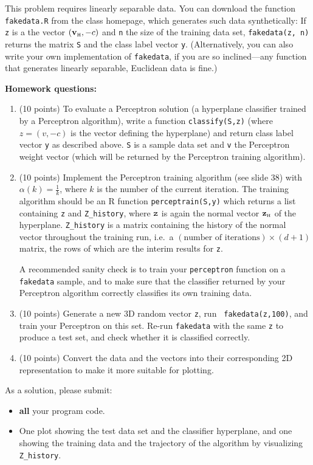 \documentclass[]{../util/ColumbiaAssm}
\begin{document}
\begin{questions}
This problem requires linearly separable data. You can download the function
{\tt fakedata.R} from the class homepage, which generates such data synthetically:
If {\tt z} is a the vector $(\mathbf{v}_{\mbox{\tiny H}},-c)$ and {\tt n} the size of the training data set,
{\tt fakedata(z, n)} returns the matrix {\tt S} and the class label vector {\tt y}.
(Alternatively, you can also write your own implementation of {\tt fakedata}, if you are so inclined---any function that generates linearly separable, Euclidean data is fine.)

\vspace{0.5cm}

\textbf{Homework questions:}
\begin{enumerate}
\item (10 points) To evaluate a Perceptron solution (a hyperplane
  classifier trained by a Perceptron algorithm), write a function
  {\tt classify(S,z)} (where $z=(v,-c)$ is the vector defining the hyperplane) 
  and return class label vector {\tt y} as described above. {\tt S} is a sample data set and {\tt v}
  the Perceptron weight vector (which will be returned by the
  Perceptron training algorithm). 
\item (10 points) Implement the Perceptron training algorithm (see slide 38) with 
    ${\alpha\left( k\right) = \frac{1}{k}}$,
    where $k$ is the number of the current
    iteration. The training algorithm should be an R function 
    {\tt perceptrain(S,y)} which returns a list containing {\tt z} and {\tt Z\_history},
    where ${\tt z}$ is again the normal vector $\mathbf{z}_{\mbox{\tiny H}}$ of the hyperplane.
    {\tt Z\_history} is a matrix containing the history
    of the normal vector throughout the training run, i.e.\ a 
    $\left(\mbox{number of iterations}\right)\times\left( d+1\right)$
    matrix, the rows of which are the interim results for {\tt z}.
    
  A recommended sanity check is to train your
  {\tt perceptron} function on a {\tt fakedata} sample, and to make
  sure that the classifier returned by your Perceptron algorithm
  correctly classifies its own training data.
\item (10 points) Generate a new 3D random vector {\tt z}, run {\tt
  fakedata(z,100)}, and train your Perceptron on this
  set. Re-run 
  {\tt fakedata} with the same {\tt z} to produce a test set, and check whether
  it is classified correctly.
\item (10 points) Convert the data and the vectors into their corresponding 2D representation to
  make it more suitable for plotting.
\end{enumerate}
As a solution, please submit:
\begin{itemize}
\item \textbf{all} your program code.
\item One plot showing the test data set and the classifier
  hyperplane, and one showing the training data and the trajectory of the algorithm by
  visualizing {\tt Z\_history}.
  \end{itemize}    


\end{questions}
\end{document}
